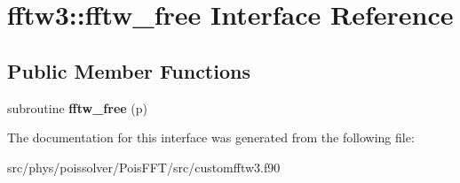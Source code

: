 \hypertarget{interfacefftw3_1_1fftw__free}{}\section{fftw3\+:\+:fftw\+\_\+free Interface Reference}
\label{interfacefftw3_1_1fftw__free}
\subsection*{Public Member Functions}
\begin{DoxyCompactItemize}
\item 
subroutine {\bfseries fftw\+\_\+free} (p)\hypertarget{interfacefftw3_1_1fftw__free_adffd9c03965b1c469074ee28aef09a0a}{}\label{interfacefftw3_1_1fftw__free_adffd9c03965b1c469074ee28aef09a0a}

\end{DoxyCompactItemize}


The documentation for this interface was generated from the following file\+:\begin{DoxyCompactItemize}
\item 
src/phys/poissolver/\+Pois\+F\+F\+T/src/customfftw3.\+f90\end{DoxyCompactItemize}

